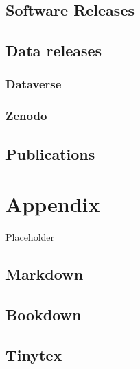 \documentclass[
  fontsize=13pt,
  english,
  a4paper,
  openany, a4paper, oneside]{article}
\begin{document}
\hypertarget{software-releases}{%
\subsection{Software Releases}\label{software-releases}}

\hypertarget{data-releases}{%
\subsection{Data releases}\label{data-releases}}

\hypertarget{dataverse}{%
\subsubsection{Dataverse}\label{dataverse}}

\hypertarget{zenodo}{%
\subsubsection{Zenodo}\label{zenodo}}

\hypertarget{publications}{%
\subsection{Publications}\label{publications}}

\hypertarget{appendix}{%
\section{Appendix}\label{appendix}}

Placeholder

\hypertarget{markdown}{%
\subsection{Markdown}\label{markdown}}

\hypertarget{bookdown}{%
\subsection{Bookdown}\label{bookdown}}

\hypertarget{tinytex}{%
\subsection{Tinytex}\label{tinytex}}

  
\end{document}

